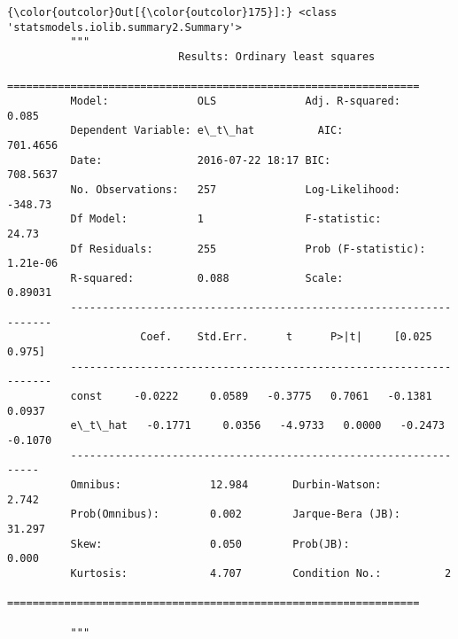 \documentclass{article}
\begin{document}
            \begin{Verbatim}[commandchars=\\\{\}]
{\color{outcolor}Out[{\color{outcolor}175}]:} <class 'statsmodels.iolib.summary2.Summary'>
          """
                           Results: Ordinary least squares
          =================================================================
          Model:              OLS              Adj. R-squared:     0.085   
          Dependent Variable: e\_t\_hat          AIC:                701.4656
          Date:               2016-07-22 18:17 BIC:                708.5637
          No. Observations:   257              Log-Likelihood:     -348.73 
          Df Model:           1                F-statistic:        24.73   
          Df Residuals:       255              Prob (F-statistic): 1.21e-06
          R-squared:          0.088            Scale:              0.89031 
          -------------------------------------------------------------------
                     Coef.    Std.Err.      t      P>|t|     [0.025    0.975]
          -------------------------------------------------------------------
          const     -0.0222     0.0589   -0.3775   0.7061   -0.1381    0.0937
          e\_t\_hat   -0.1771     0.0356   -4.9733   0.0000   -0.2473   -0.1070
          -----------------------------------------------------------------
          Omnibus:              12.984       Durbin-Watson:          2.742 
          Prob(Omnibus):        0.002        Jarque-Bera (JB):       31.297
          Skew:                 0.050        Prob(JB):               0.000 
          Kurtosis:             4.707        Condition No.:          2     
          =================================================================
          
          """
\end{Verbatim}
        
\end{document}
